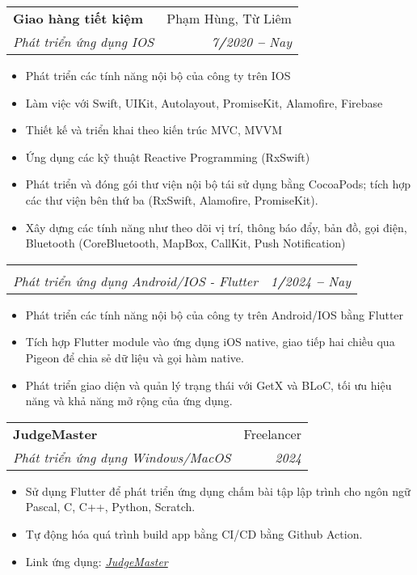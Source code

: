 \documentclass[letterpaper,11pt]{article}
\makeatletter
\newcommand{\resumeItem}[1]{
  \item\small{
    {#1 \vspace{-2pt}}
  }
}
\newcommand{\resumeSubheading}[4]{
  \vspace{-2pt}\item
    \begin{tabular*}{0.97\textwidth}[t]{l@{\extracolsep{\fill}}r}
      \textbf{#1} & #2 \\
      \textit{\small#3} & \textit{\small #4} \\
    \end{tabular*}\vspace{-7pt}
}
\newcommand{\resumeItemListStart}{\begin{itemize}}
\newcommand{\resumeItemListEnd}{\end{itemize}\vspace{-5pt}}
\makeatother
\begin{document}
    \resumeSubheading
      {Giao hàng tiết kiệm}{Phạm Hùng, Từ Liêm}
      {Phát triển ứng dụng IOS}{7\textbf{/}2020 \textbf{--} Nay}
        \resumeItemListStart
            \resumeItem{Phát triển các tính năng nội bộ của công ty trên IOS}
            \resumeItem{Làm việc với Swift, UIKit, Autolayout, PromiseKit, Alamofire, Firebase}
            \resumeItem{Thiết kế và triển khai theo kiến trúc MVC, MVVM}
            \resumeItem{Ứng dụng các kỹ thuật Reactive Programming (RxSwift)}
            \resumeItem{Phát triển và đóng gói thư viện nội bộ tái sử dụng bằng CocoaPods; tích hợp các thư viện bên thứ ba (RxSwift, Alamofire, PromiseKit).}
            \resumeItem{Xây dựng các tính năng như theo dõi vị trí, thông báo đẩy, bản đồ, gọi điện, Bluetooth (CoreBluetooth, MapBox, CallKit, Push Notification)}
        \resumeItemListEnd
    \resumeSubheading
      {}{}
      {Phát triển ứng dụng Android/IOS - Flutter}{1\textbf{/}2024 \textbf{--} Nay}
        \resumeItemListStart
            \resumeItem{Phát triển các tính năng nội bộ của công ty trên Android/IOS bằng Flutter}
            \resumeItem{Tích hợp Flutter module vào ứng dụng iOS native, giao tiếp hai chiều qua Pigeon để chia sẻ dữ liệu và gọi hàm native.}
            \resumeItem{Phát triển giao diện và quản lý trạng thái với GetX và BLoC, tối ưu hiệu năng và khả năng mở rộng của ứng dụng.}
        \resumeItemListEnd
    
    \resumeSubheading
      {JudgeMaster}{Freelancer}
      {Phát triển ứng dụng Windows/MacOS}{2024}
        \resumeItemListStart
            \resumeItem{Sử dụng Flutter để phát triển ứng dụng chấm bài tập lập trình cho ngôn ngữ Pascal, C, C++, Python, Scratch.}
            \resumeItem{Tự động hóa quá trình build app bằng CI/CD bằng Github Action.}
            \resumeItem{Link ứng dụng: \emph{\href{https://www.judgemaster.com}{\color{blue}JudgeMaster}}}
    \resumeItemListEnd
    
\end{document}
